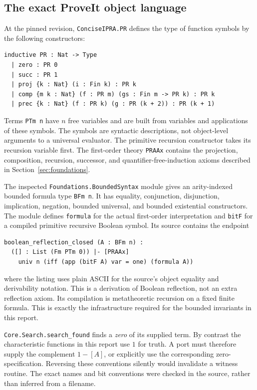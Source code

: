 \subsection{The exact ProveIt object language}
At the pinned revision, \texttt{ConciseIPRA.PR} defines the type of function symbols by the following constructors:
\begin{lstlisting}[language={}]
inductive PR : Nat -> Type
  | zero : PR 0
  | succ : PR 1
  | proj {k : Nat} (i : Fin k) : PR k
  | comp {m k : Nat} (f : PR m) (gs : Fin m -> PR k) : PR k
  | prec {k : Nat} (f : PR k) (g : PR (k + 2)) : PR (k + 1)
\end{lstlisting}
Terms \texttt{PTm n} have $n$ free variables and are built from variables and applications of these symbols. The symbols are syntactic descriptions, not object-level arguments to a universal evaluator. The primitive recursion constructor takes its recursion variable first. The first-order theory \texttt{PRAAx} contains the projection, composition, recursion, successor, and quantifier-free-induction axioms described in Section~\ref{sec:foundations}.

The inspected \texttt{Foundations.BoundedSyntax} module gives an arity-indexed bounded formula type \texttt{BFm n}. It has equality, conjunction, disjunction, implication, negation, bounded universal, and bounded existential constructors. The module defines \texttt{formula} for the actual first-order interpretation and \texttt{bitF} for a compiled primitive recursive Boolean symbol. Its source contains the endpoint
\begin{lstlisting}[language={}]
boolean_reflection_closed (A : BFm n) :
  ([] : List (Fm PTm 0)) |- [PRAAx]
    univ n (iff (app (bitF A) var = one) (formula A))
\end{lstlisting}
where the listing uses plain ASCII for the source's object equality and derivability notation. This is a derivation of Boolean reflection, not an extra reflection axiom. Its compilation is metatheoretic recursion on a fixed finite formula. This is exactly the infrastructure required for the bounded invariants in this report.

\texttt{Core.Search.search\_found} finds a \emph{zero} of its supplied term. By contrast the characteristic functions in this report use $1$ for truth. A port must therefore supply the complement $1-[A]$, or explicitly use the corresponding zero-specification. Reversing these conventions silently would invalidate a witness routine. The exact names and bit conventions were checked in the source, rather than inferred from a filename.

